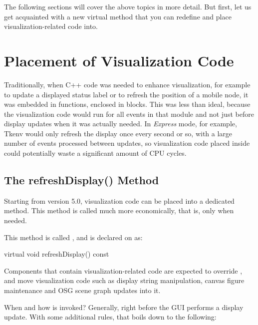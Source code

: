 The following sections will cover the above topics in more detail. But first,
let us get acquainted with a new  virtual method that you
can redefine and place visualization-related code into.


\section{Placement of Visualization Code}
\label{sec:ch-graphics:refreshdisplay}

Traditionally, when C++ code was needed to enhance visualization, for
example to update a displayed status label or to refresh the position of a
mobile node, it was embedded in  functions, enclosed
in  blocks. This was less than ideal, because the
visualization code would run for all events in that module and not just
before display updates when it was actually needed. In \textit{Express} mode,
for example, Tkenv would only refresh the display once every second or so,
with a large number of events processed between updates, so visualization
code placed inside  could potentially waste a
significant amount of CPU cycles.


\subsection{The refreshDisplay() Method}

Starting from {\opp} version 5.0, visualization code can be placed into a
dedicated method. This method is called much more economically, that is, only
when needed.

This method is called , and is declared on
 as:

\begin{cpp}
virtual void refreshDisplay() const {}
\end{cpp}

Components that contain visualization-related code are expected to override
, and move visualization code such as display string
manipulation, canvas figure maintenance and OSG scene graph updates into it.

When and how is  invoked? Generally, right before
the GUI performs a display update. With some additional rules, that boils
down to the following:

